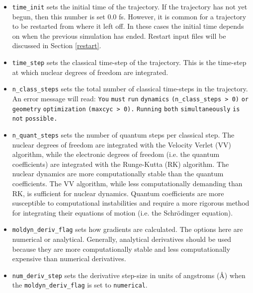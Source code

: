 \begin{itemize}
\item \verb+time_init+ sets the initial time of the trajectory.  If the trajectory has not yet begun, then this number is set 0.0 fs.  However, it is common for a trajectory to be restarted from where it left off.  In these cases the initial time depends on when the previous simulation has ended.  Restart input files will be discussed in Section \ref{restart}.
\item \verb+time_step+ sets the classical time-step of the trajectory.  This is the time-step at which nuclear degrees of freedom are integrated.
\item \verb+n_class_steps+ sets the total number of classical time-steps in the trajectory.  An error message will read: \verb+You+ \verb+must+ \verb+run+ \verb+dynamics+ \verb+(n_class_steps > 0)+ \verb+or+ \verb+geometry+ \verb+optimization+ \verb+(maxcyc > 0).+ \verb+Running+ \verb+both+ \verb+simultaneously+ \verb+is+ \verb+not+ \verb+possible.+
\item \verb+n_quant_steps+ sets the number of quantum steps per classical step.  The nuclear degrees of freedom are integrated with the Velocity Verlet (VV) algorithm, while the electronic degrees of freedom (i.e. the quantum coefficients) are integrated with the Runge-Kutta (RK) algorithm.  The nuclear dynamics are more computationally stable than the quantum coefficients.  The VV algorithm, while less computationally demanding than RK, is sufficient for nuclear dynamics.  Quantum coefficients are more susceptible to computational instabilities and require a more rigorous method for integrating their equations of motion (i.e. the Schr\"{o}dinger equation).
\item \verb+moldyn_deriv_flag+ sets how gradients are calculated.  The options here are numerical or analytical.  Generally, analytical derivatives should be used because they are more computationally stable and less computationally expensive than numerical derivatives.
\item \verb+num_deriv_step+ sets the derivative step-size in units of angstroms (\AA) when the \verb+moldyn_deriv_flag+ is set to \verb+numerical+.
\end{itemize}

